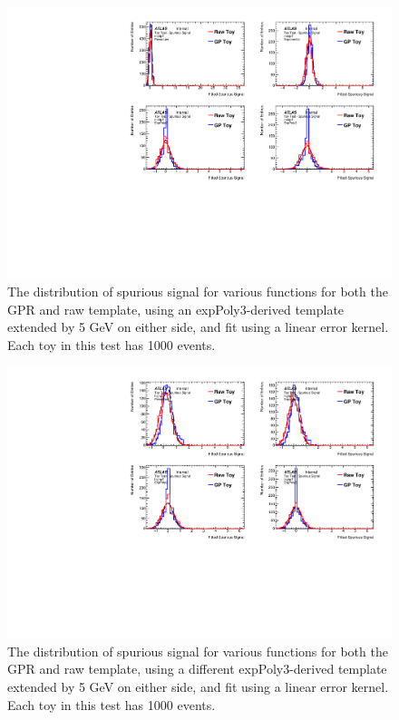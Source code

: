 \begin{figure} 
\begin{center}
  \includegraphics[width=\textwidth]{figures/background/gpr/validation/linear/ToyTest_FitSigVals_medpT_1000_noSig}   
\caption{The distribution of spurious signal for various functions for both the GPR and raw template, using an expPoly3-derived template extended by 5 GeV on either side, and fit using a linear error kernel. Each toy in this test has 1000 events.}
\label{fig:linearkernel_medpt_1000_noSig}
\end{center}
\end{figure}

\begin{figure} 
\begin{center}
  \includegraphics[width=\textwidth]{figures/background/gpr/validation/linear/ToyTest_FitSigVals_highpT_1000_noSig}   
\caption{The distribution of spurious signal for various functions for both the GPR and raw template, using a different expPoly3-derived template extended by 5 GeV on either side, and fit using a linear error kernel. Each toy in this test has 1000 events.}
\label{fig:linearkernel_highpt_1000_noSig}
\end{center}
\end{figure}

